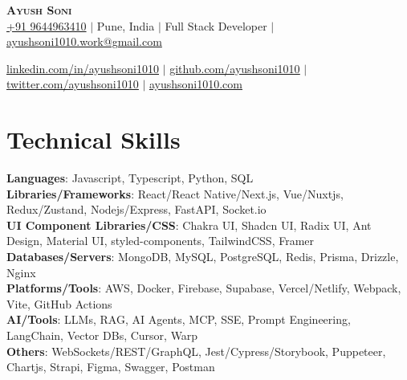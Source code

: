 \documentclass[letterpaper,10pt]{article}
\begin{document}

\begin{center}
\textbf{\Huge \scshape Ayush Soni} \\ \vspace{10pt}
\href{tel:9644963410}{+91 9644963410} $|$
{Pune, India} $|$
{Full Stack Developer} $|$
\href{mailto:ayushsoni1010.work@gmail.com}{ayushsoni1010.work@gmail.com} \\ \vspace{3pt}

\href{https://linkedin.com/in/ayushsoni1010}{\underline{linkedin.com/in/ayushsoni1010}} $|$
\href{https://github.com/ayushsoni1010}{\underline{github.com/ayushsoni1010}} $|$
\href{https://twitter.com/ayushsoni1010}{\underline{twitter.com/ayushsoni1010}} $|$
\href{https://ayushsoni1010.com}{\underline{ayushsoni1010.com}}
\end{center}



\section{Technical Skills}
\begin{itemize}[leftmargin=0.15in, label={}]
\small{\item{
      \textbf{Languages}{: \hfill Javascript, Typescript, Python, SQL } \\
      \vspace{3pt}\textbf{Libraries/Frameworks}{: \hfill React/React Native/Next.js, Vue/Nuxtjs, Redux/Zustand, Nodejs/Express, FastAPI, Socket.io} \\
      \vspace{3pt}\textbf{UI Component Libraries/CSS}{: \hfill Chakra UI, Shadcn UI, Radix UI, Ant Design, Material UI, styled-components, TailwindCSS, Framer} \\
      \vspace{3pt}\textbf{Databases/Servers}{: \hfill MongoDB, MySQL, PostgreSQL, Redis, Prisma, Drizzle, Nginx} \\
      \vspace{3pt}\textbf{Platforms/Tools}{: \hfill AWS, Docker, Firebase, Supabase, Vercel/Netlify, Webpack, Vite, GitHub Actions} \\
      \vspace{3pt}\textbf{AI/Tools}{: \hfill LLMs, RAG, AI Agents, MCP, SSE, Prompt Engineering, LangChain, Vector DBs, Cursor, Warp} \\
      \vspace{3pt}\textbf{Others}{: \hfill WebSockets/REST/GraphQL, Jest/Cypress/Storybook, Puppeteer, Chartjs, Strapi, Figma, Swagger, Postman}
      }}
\end{itemize}
\end{document}
